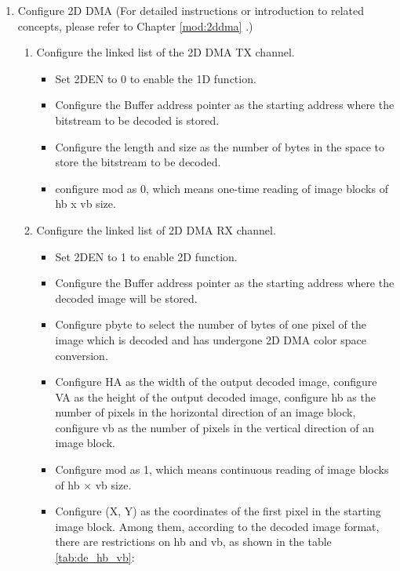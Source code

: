 \documentclass[main\_\_EN.tex]{subfiles}
\begin{document}
\begin{enumerate}
\begin{itemize}
\begin{itemize}
{\begin{longtable}{ | L{4cm} | L{4cm} | l | l |}
                \end{longtable}
                }
        \end{itemize}
    \end{itemize}
    \item Configure 2D DMA (For detailed instructions or introduction to related concepts, please refer to Chapter \ref{mod:2ddma} \textit{}.)
    \begin{enumerate}
        \item Configure the linked list of the 2D DMA TX channel.
        \begin{itemize}
            \item Set 2DEN to 0 to enable the 1D function.
            \item Configure the Buffer address pointer as the starting address where the bitstream to be decoded is stored.
            \item Configure the length and size as the number of bytes in the space to store the bitstream to be decoded.
            \item configure mod as 0, which means one-time reading of image blocks of hb x vb size.
        \end{itemize}
        \item Configure the linked list of 2D DMA RX channel.
        \begin{itemize}
            \item Set 2DEN to 1 to enable 2D function.
            \item Configure the Buffer address pointer as the starting address where the decoded image will be stored.
            \item Configure pbyte to select the number of bytes of one pixel of the image which is decoded and has undergone 2D DMA color space conversion.
            \item Configure HA as the width of the output decoded image, configure VA as the height of the output decoded image, configure hb as the number of pixels in the horizontal direction of an image block, configure vb as the number of pixels in the vertical direction of an image block.
            \item Configure mod as 1, which means continuous reading of image blocks of hb × vb size.
            \item Configure (X, Y) as the coordinates of the first pixel in the starting image block. Among them, according to the decoded image format, there are restrictions on hb and vb, as shown in the table \ref{tab:de_hb_vb}:

\end{itemize}
\end{enumerate}
\end{enumerate}
\end{document}
